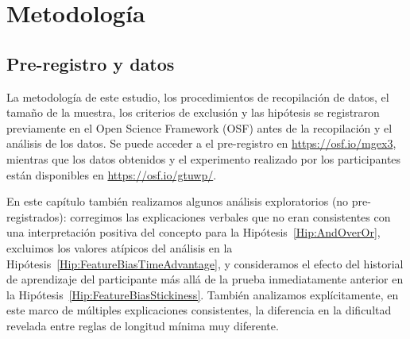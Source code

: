 \section{Metodología}\label{Sec:AdditionalMethodology}


\subsection{Pre-registro y datos}

La metodología de este estudio, los procedimientos de recopilación de datos, el tamaño de la muestra, los criterios de exclusión y las hipótesis se registraron previamente en el Open Science Framework (OSF) antes de la recopilación y el análisis de los datos. Se puede acceder a el pre-registro en \url{https://osf.io/mgex3}, mientras que los datos obtenidos y el experimento realizado por los participantes están disponibles en \url{https://osf.io/gtuwp/}.

En este capítulo también realizamos algunos análisis exploratorios (no pre-registrados): corregimos las explicaciones verbales que no eran consistentes con una interpretación positiva del concepto para la Hipótesis~\ref{Hip:AndOverOr}, excluimos los valores atípicos del análisis en la Hipótesis~\ref{Hip:FeatureBiasTimeAdvantage}, y consideramos el efecto del historial de aprendizaje del participante más allá de la prueba inmediatamente anterior en la Hipótesis~\ref{Hip:FeatureBiasStickiness}. También analizamos explícitamente, en este marco de múltiples explicaciones consistentes, la diferencia en la dificultad revelada entre reglas de longitud mínima muy diferente.

